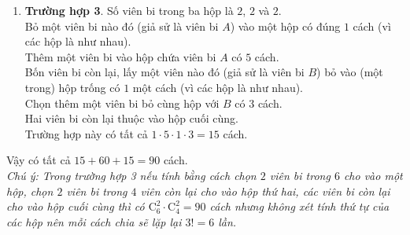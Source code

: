 \begin{ex}
{\begin{enumerate}
			\item\textbf{Trường hợp 3}. Số viên bi trong ba hộp là $2$, $2$ và $2$.\\
			Bỏ một viên bi nào đó (giả sử là viên bi $A$) vào một hộp có đúng $1$ cách (vì các hộp là như nhau).\\
			Thêm một viên bi vào hộp chứa viên bi $A$ có $5$ cách.\\
			Bốn viên bi còn lại, lấy một viên nào đó (giả sử là viên bi $B$) bỏ vào (một trong) hộp trống có $1$ một cách (vì các hộp là như nhau).\\
			Chọn thêm một viên bi bỏ cùng hộp với $B$ có $3$ cách.\\
			Hai viên bi còn lại thuộc vào hộp cuối cùng.\\
			Trường hợp này có tất cả $1\cdot 5\cdot 1\cdot 3=15$ cách.
		\end{enumerate}
		Vậy có tất cả $15+60+15=90$ cách.\\
		\textit{Chú ý: Trong trường hợp 3 nếu tính bằng cách chọn $2$ viên bi trong $6$ cho vào một hộp, chọn $2$ viên bi trong $4$ viên còn lại cho vào hộp thứ hai, các viên bi còn lại cho vào hộp cuối cùng thì có $\mathrm{C}_6^2\cdot \mathrm{C}_4^2=90$ cách nhưng không xét tính thứ tự của các hộp nên mỗi cách chia sẽ lặp lại $3!=6$ lần.}}
\end{ex}
\newpage
{}
\label{B\thedeso}